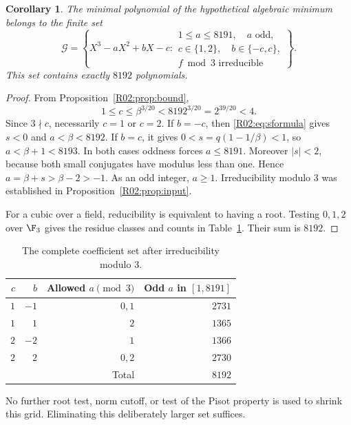 \documentclass[11pt,a4paper]{article}
\newtheorem{corollary}[theorem]{Corollary}\newtheorem{mainthm}[theorem]{Theorem}
\theoremstyle{definition}\newtheorem{definition}[theorem]{Definition}
\theoremstyle{remark}\newtheorem{remark}[theorem]{Remark}
\begin{document}
\begin{corollary}\label{R02:cor:grid}
The minimal polynomial of the hypothetical algebraic minimum belongs
to the finite set
\begin{equation}\label{R02:eq:grid}
 \mathcal G=\left\{X^3-aX^2+bX-c:
 \begin{array}{l}
 1\le a\le8191,\quad a\text{ odd},\\
 c\in\{1,2\},\quad b\in\{-c,c\},\\
 f\bmod3\text{ irreducible}
 \end{array}\right\}.
\end{equation}
This set contains exactly $8192$ polynomials.
\end{corollary}
\begin{proof}
From Proposition~\ref{R02:prop:bound},
\[
 1\le c\le\beta^{3/20}<8192^{3/20}=2^{39/20}<4.
\]
Since $3\nmid c$, necessarily $c=1$ or $c=2$.
If $b=-c$, then \eqref{R02:eq:sformula} gives $s<0$ and $a<\beta<8192$.
If $b=c$, it gives $0<s=q(1-1/\beta)<1$, so
$a<\beta+1<8193$. In both cases oddness forces $a\le8191$.
Moreover $|s|<2$, because both small conjugates have modulus less
than one. Hence $a=\beta+s>\beta-2>-1$. As an odd integer, $a\ge1$.
Irreducibility modulo $3$ was established in
Proposition~\ref{R02:prop:input}.

For a cubic over a field, reducibility is equivalent to having a root.
Testing $0,1,2$ over $\F_3$ gives the residue classes and counts in
Table~\ref{R02:tab:grid}. Their sum is $8192$.
\end{proof}

\begin{table}[ht]
\centering
\begin{tabular}{rrrr}
\toprule
$c$ & $b$ & Allowed $a\pmod3$ & Odd $a$ in $[1,8191]$\\
\midrule
$1$ & $-1$ & $0,1$ & $2731$\\
$1$ & $1$ & $2$ & $1365$\\
$2$ & $-2$ & $1$ & $1366$\\
$2$ & $2$ & $0,2$ & $2730$\\
\midrule
\multicolumn{3}{r}{Total} & $8192$\\
\bottomrule
\end{tabular}
\caption{The complete coefficient set after irreducibility modulo $3$.}
\label{R02:tab:grid}
\end{table}

No further root test, norm cutoff, or test of the Pisot property is used
to shrink this grid. Eliminating this deliberately larger set suffices.
\end{document}
